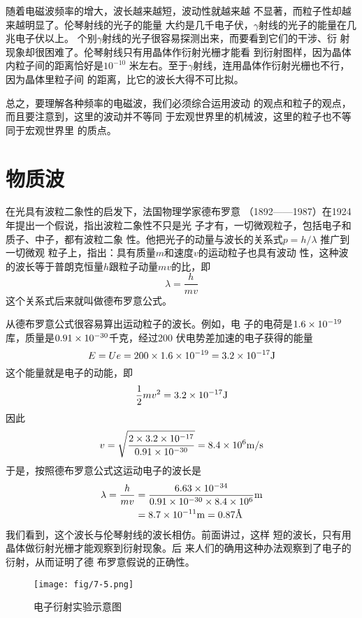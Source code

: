 随着电磁波频率的增大，波长越来越短，波动性就越来越
不显著，而粒子性却越来越明显了。伦琴射线的光子的能量
大约是几千电子伏，$\gamma$射线的光子的能量在几兆电子伏以上。
个别$\gamma$射线的光子很容易探测出来，而要看到它们的干涉、衍
射现象却很困难了。伦琴射线只有用晶体作衍射光栅才能看
到衍射图样，因为晶体内粒子间的距离恰好是$10^{-10}$
米左右。至于$\gamma$射线，连用晶体作衍射光栅也不行，因为晶体里粒子间
的距离，比它的波长大得不可比拟。

总之，要理解各种频率的电磁波，我们必须综合运用波动
的观点和粒子的观点，而且要注意到，这里的波动并不等同
于宏观世界里的机械波，这里的粒子也不等同于宏观世界里
的质点。

\section{物质波}
在光具有波粒二象性的启发下，法国物理学家德布罗意
（1892——1987）在1924年提出一个假说，指出波粒二象性不只是光
子才有，一切微观粒子，包括电子和质子、中子，都有波粒二象
性。他把光子的动量与波长的关系式$p=h/\lambda$
推广到一切微观
粒子上，指出：具有质量$m$和速度$v$的运动粒子也具有波动
性，这种波的波长等于普朗克恒量$h$跟粒子动量$mv$的比，即
\[\lambda=\frac{h}{mv} \]
这个关系式后来就叫做德布罗意公式。

从德布罗意公式很容易算出运动粒子的波长。例如，电
子的电荷是$1.6\times10^{-19}$
库，质量是$0.91\times10^{-30}$千克，经过200
伏电势差加速的电子获得的能量
\[E=Ue=200\times1.6\times10^{-19}=3.2\times10^{-17}{\rm J}\]
这个能量就是电子的动能，即
\[\dfrac{1}{2}mv^2=3.2\times10^{-17}{\rm J} \]
因此
\[v=\sqrt{\frac{2\times 3.2\times10^{-17}}{0.91\times 10^{-30}}}=8.4\times10^6\text{m}/\text{s} \]
于是，按照德布罗意公式这运动电子的波长是
\[\begin{split}
    \lambda=\dfrac{h}{mv}&=\frac{6.63\times 10^{-34}}{0.91\times10^{-30}\times8.4\times 10^6}{\rm m} \\
&=8.7\times10^{-11}{\rm m}=0.87\text{\AA}
\end{split}\]
我们看到，这个波长与伦琴射线的波长相仿。前面讲过，这样
短的波长，只有用晶体做衍射光栅才能观察到衍射现象。后
来人们的确用这种办法观察到了电子的衍射，从而证明了德
布罗意假说的正确性。
\begin{figure}[htp]\centering
    \texttt{[image: fig/7-5.png]}
    \caption{电子衍射实验示意图}
    \end{figure}

